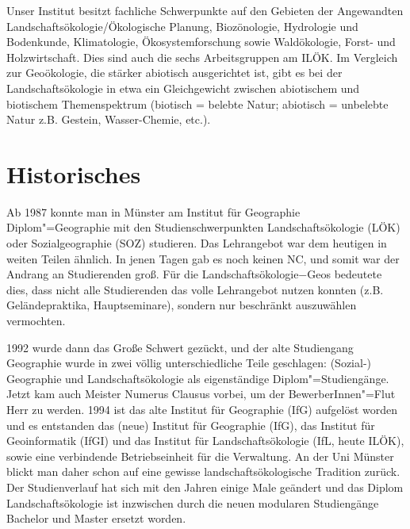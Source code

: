 Unser Institut besitzt fachliche Schwerpunkte auf den Gebieten der Angewandten Landschaftsökologie/Ökologische Planung, Biozönologie, Hydrologie und Bodenkunde, Klimatologie, Ökosystemforschung sowie Waldökologie, Forst- und Holzwirtschaft. Dies sind auch die sechs Arbeitsgruppen am ILÖK. Im Vergleich zur Geoökologie, die stärker abiotisch ausgerichtet ist, gibt es bei der Landschaftsökologie in etwa ein Gleichgewicht zwischen abiotischem und biotischem Themenspektrum (biotisch = belebte Natur; abiotisch = unbelebte Natur z.B. Gestein, Wasser-Chemie, etc.).

\section*{Historisches}
Ab 1987 konnte man in Münster am Institut für Geographie Diplom"=Geographie mit den Studienschwerpunkten Landschaftsökologie (LÖK) oder Sozialgeographie (SOZ) studieren. Das Lehrangebot war dem heutigen in weiten Teilen ähnlich. In jenen Tagen gab es noch keinen NC, und somit war der Andrang an Studierenden groß. Für die Landschaftsökologie−Geos bedeutete dies, dass nicht alle Studierenden das volle Lehrangebot nutzen konnten (z.B. Geländepraktika, Hauptseminare), sondern nur beschränkt auszuwählen vermochten.

1992 wurde dann das Große Schwert gezückt, und der alte Studiengang Geographie wurde in zwei völlig unterschiedliche Teile geschlagen: (Sozial-) Geographie und Landschaftsökologie als eigenständige Diplom"=Studiengänge. Jetzt kam auch Meister Numerus Clausus vorbei, um der BewerberInnen"=Flut Herr zu werden. 1994 ist das alte Institut für Geographie (IfG) aufgelöst worden und es entstanden das (neue) Institut für Geographie (IfG), das Institut für Geoinformatik (IfGI) und das Institut für Landschaftsökologie (IfL, heute ILÖK), sowie eine verbindende Betriebseinheit für die Verwaltung.
An der Uni Münster blickt man daher schon auf eine gewisse landschaftsökologische Tradition zurück. Der Studienverlauf hat sich mit den Jahren einige Male geändert und das Diplom Landschaftsökologie ist inzwischen durch die neuen modularen Studiengänge Bachelor und Master ersetzt worden.

